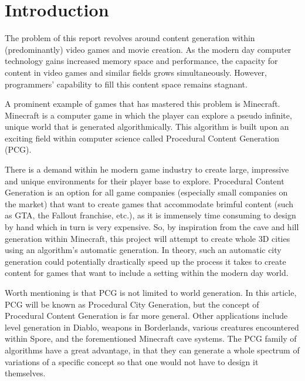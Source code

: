 \section{Introduction}
The problem of this report revolves around content generation within (predominantly) video games and movie creation. As the modern day computer technology gains increased memory space and performance, the capacity for content in video games and similar fields grows simultaneously. However, programmers' capability to fill this content space remains stagnant.

A prominent example of games that has mastered this problem is Minecraft. Minecraft is a computer game in which the player can explore a pseudo infinite, unique world that is generated algorithmically. This algorithm is built upon an exciting field within computer science called Procedural Content Generation (PCG). 

There is a demand within he modern game industry to create large, impressive and unique environments for their player base to explore. Procedural Content Generation is an option for all game companies (especially small companies on the market) that want to create games that accommodate brimful content (such as GTA, the Fallout franchise, etc.), as it is immensely time consuming to design by hand which in turn is very expensive. So, by inspiration from the cave and hill generation within Minecraft, this project will attempt to create whole 3D cities using an algorithm's automatic generation. In theory, such an automatic city generation could potentially drastically speed up the process it takes to create content for games that want to include a setting within the modern day world.

Worth mentioning is that PCG is not limited to world generation. In this article, PCG will be known as Procedural City Generation, but the concept of Procedural Content Generation is far more general. Other applications include level generation in Diablo, weapons in Borderlands, various creatures encountered within Spore, and the forementioned Minecraft cave systems. The PCG family of algorithms have a great advantage, in that they can generate a whole spectrum of variations of a specific concept so that one would not have to design it themselves.
